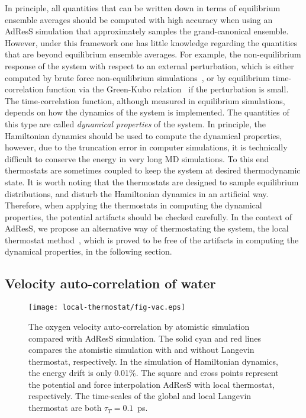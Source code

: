 \documentclass[epjST]{svjour}
\newcommand{\recheck}[1]{{\color{red} #1}}
\begin{document}
In principle, all quantities that
can be written down in terms of equilibrium ensemble averages should
be computed with high accuracy when using an AdResS simulation that approximately samples the grand-canonical ensemble.
However, under this framework one has little knowledge regarding the quantities
that are \recheck{beyond equilibrium} ensemble averages.
For example, the non-equilibrium response of the system
with respect to an external perturbation, which is 
either computed by brute force non-equilibrium simulations~\cite{wang2014exploring}, or by
equilibrium time-correlation function via the Green-Kubo
relation~\cite{green1954markoff,kubo1957statistical} if the perturbation is small. The
time-correlation function, although measured in equilibrium
simulations, depends on how the dynamics
of the system is implemented.
The quantities of this type are called \emph{dynamical properties} of the system.
In principle, the Hamiltonian dynamics should be used to compute the dynamical properties,
however, due to the truncation error in computer simulations, it
is technically difficult to conserve the energy in very long MD simulations.
To this end thermostats are sometimes coupled to keep the system at desired thermodynamic
state.
It is worth noting that the thermostats are designed to sample equilibrium distributions, and 
disturb the Hamiltonian dynamics in an artificial way.
Therefore, when applying the thermostats
in computing the dynamical properties, the potential artifacts
should be checked carefully.
In the context of AdResS, we propose an alternative way of thermostating
the system, the local thermostat method~\cite{wang2014exploring},
which is proved to be free of the artifacts in computing the dynamical properties, in the following section.



\subsection{Velocity auto-correlation of water}

\begin{figure}
  \centering
  \texttt{[image: local-thermostat/fig-vac.eps]}
  \caption{The oxygen velocity auto-correlation by atomistic
    simulation compared with AdResS simulation.  The solid cyan and
    red lines compares the atomistic simulation with and without
    Langevin thermostat, respectively.
    In the simulation of Hamiltonian dynamics, the energy drift is only 0.01\%.
    The square and cross points
    represent the potential and force interpolation AdResS with local
    thermostat, respectively.  The time-scales of the global and local Langevin
  thermostat are both $\tau_T = 0.1$~ps.}
  \label{fig:vac}
\end{figure}
\end{document}
